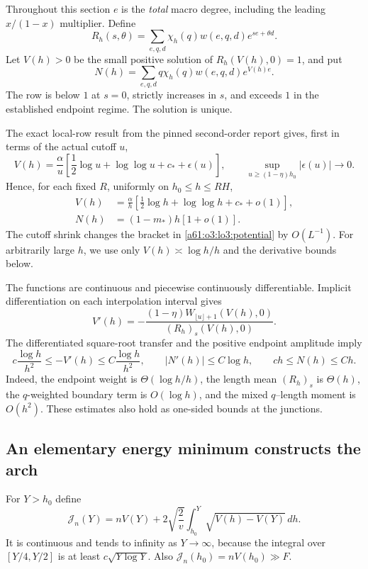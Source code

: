 \documentclass[11pt,letterpaper]{article}
\numberwithin{equation}{section}
\theoremstyle{remark}\newtheorem{remark}[theorem]{Remark}
\begin{document}
Throughout this section $e$ is the \emph{total} macro degree, including
the leading $x/(1-x)$ multiplier. Define
\begin{equation}\label{a61:o3:lo3:row}
 R_h(s,\theta)=\sum_{e,q,d}\chi_h(q)w(e,q,d)e^{se+\theta d}.
\end{equation}
Let $V(h)>0$ be the small positive solution of $R_h(V(h),0)=1$, and put
\[
 N(h)=\sum_{e,q,d}q\chi_h(q)w(e,q,d)e^{V(h)e}.
\]
The row is below $1$ at $s=0$, strictly increases in $s$, and exceeds
$1$ in the established endpoint regime. The solution is unique.

The exact local-row result from the pinned second-order report gives,
first in terms of the actual cutoff $u$,
\[
 V(h)=\frac\alpha u
       \left[\frac12\log u+\log\log u+c_*+\epsilon(u)\right],
 \qquad\sup_{u\ge(1-\eta)h_0}|\epsilon(u)|\longrightarrow0.
\]
Hence, for each fixed $R$, uniformly on $h_0\le h\le RH$,
\begin{align}
 V(h)&=\frac\alpha h
       \left[\frac12\log h+\log\log h+c_*+o(1)\right],
       \label{a61:o3:lo3:potential}\\
 N(h)&=(1-m_*)h[1+o(1)].\label{a61:o3:lo3:qmean}
\end{align}
The cutoff shrink changes the bracket in \eqref{a61:o3:lo3:potential} by
$O(L^{-1})$. For arbitrarily large $h$, we use only
$V(h)\asymp\log h/h$ and the derivative bounds below.

The functions are continuous and piecewise continuously
differentiable. Implicit differentiation on each interpolation
interval gives
\[
 V'(h)=-\frac{(1-\eta)W_{\lfloor u\rfloor+1}(V(h),0)}
                      {(R_h)_s(V(h),0)}.
\]
The differentiated square-root transfer and the positive endpoint
amplitude imply
\begin{equation}\label{a61:o3:lo3:derivative-bounds}
 c\frac{\log h}{h^2}\le -V'(h)\le C\frac{\log h}{h^2},
 \qquad |N'(h)|\le C\log h,
 \qquad ch\le N(h)\le Ch.
\end{equation}
Indeed, the endpoint weight is $\Theta(\log h/h)$, the length
mean $(R_h)_s$ is $\Theta(h)$, the $q$-weighted boundary term is
$O(\log h)$, and the mixed $q$--length moment is $O(h^2)$.
These estimates also hold as one-sided bounds at the junctions.

\subsection{An elementary energy minimum constructs the arch}

For $Y>h_0$ define
\begin{equation}\label{a61:o3:lo3:energy-function}
 \mathcal J_n(Y)=nV(Y)+2\sqrt{\frac2v}
             \int_{h_0}^Y\sqrt{V(h)-V(Y)}\,dh.
\end{equation}
It is continuous and tends to infinity as $Y\to\infty$, because the
integral over $[Y/4,Y/2]$ is at least $c\sqrt{Y\log Y}$.
Also $\mathcal J_n(h_0)=nV(h_0)\gg F$.
\end{document}
